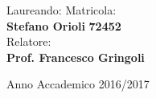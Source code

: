 \documentclass[12pt,a4paper]{report}
\begin{document}
\begin{titlepage}
\begin{minipage}{0.75\textwidth}
\begin{flushleft}
{			 \large{Laureando:} \hfill {Matricola: \\
			 {\bfseries Stefano Orioli}      
			  \hfill \bfseries 72452}
			\vspace{1 cm} \\
			
			\large{Relatore:} \\
			{\bfseries Prof. Francesco Gringoli}
					
		}
		\end{flushleft}
	\end{minipage}
	
	\vspace {2.5 cm}

	{\large Anno Accademico 2016/2017}
	
\end{titlepage}
\end{document}
